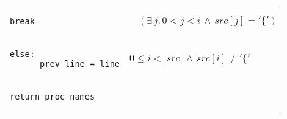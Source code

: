 \documentclass[10pt, a4paper]{article}
\begin{document}
\begin{tabular}{@{}ll}
{
\begin{lstlisting}[firstnumber=last, backgroundcolor=\color{darkorange}]
          break
\end{lstlisting}}
& $ \ \ \ \ (\exists \,j.\,0 < j < i \,\wedge\, src[j] =  \mathtt{'\{'})$\\
{
\begin{lstlisting}[firstnumber=last, backgroundcolor=\color{lightbrown}]
    else:
      prev_line = line
\end{lstlisting}}
&$0 \le i < |src| \,\wedge\, src[i] \ne \mathtt{'\{'}$\\
{
\begin{lstlisting}[firstnumber=last]
  return proc_names
\end{lstlisting}}
&\\
\end{tabular}\\



%
%
\end{document}
